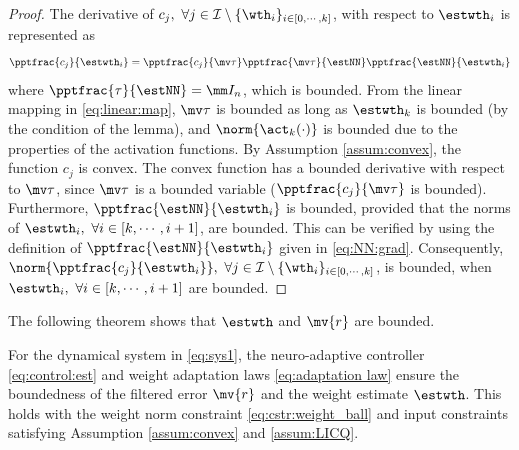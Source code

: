 \documentclass[lettersize,journal]{IEEEtran}
\newcommand*{\fe}{\mv{r}}
\begin{document}
\begin{proof}

The derivative of $c_j,\ \forall j\in\mathcal I \setminus \{\wth_i\}_{i\in[0,\cdots,k]}$, with respect to $\estwth_i$ is represented as
\begin{equation}
    \pptfrac{c_j}{\estwth_i} 
    = 
    \pptfrac{c_j}{\mv\tau} 
    \pptfrac{\mv\tau}{\estNN} 
    \pptfrac{\estNN}{\estwth_i}
\end{equation}
where $\pptfrac{\tau}{\estNN}=\mm I_n$, which is bounded. 
From the linear mapping in \eqref{eq:linear:map}, $\mv\tau$ is bounded as long as $\estwth_k$ is bounded (by the condition of the lemma), and $\norm{\act_k(\cdot)}$ is bounded due to the properties of the activation functions. 
By Assumption \ref{assum:convex}, the function $c_j$ is convex. 
The convex function has a bounded derivative with respect to $\mv\tau$, since $\mv\tau$ is a bounded variable (\ie $\pptfrac{c_j}{\mv\tau}$ is bounded). 
Furthermore, $\pptfrac{\estNN}{\estwth_i}$ is bounded, provided that the norms of $\estwth_i,\ \forall i \in[k,\cdots,i+1]$, are bounded. 
This can be verified by using the definition of $\pptfrac{\estNN}{\estwth_i}$ given in \eqref{eq:NN:grad}.
Consequently, $\norm{\pptfrac{c_j}{\estwth_i}},\ \forall j\in\mathcal I \setminus \{\wth_i\}_{i\in[0,\cdots,k]}$, is bounded, when $\estwth_i,\ \forall i\in [k,\cdots,i+1]$ are bounded.

\end{proof}

The following theorem shows that $\estwth$ and $\fe$ are bounded.

\begin{theorem}
    For the dynamical system in \eqref{eq:sys1}, the neuro-adaptive controller \eqref{eq:control:est} and weight adaptation laws \eqref{eq:adaptation law} ensure the boundedness of the filtered error $\fe$ and the weight estimate $\estwth$. 
    This holds with the weight norm constraint \eqref{eq:cstr:weight_ball} and input constraints satisfying Assumption \ref{assum:convex} and \ref{assum:LICQ}.
\end{theorem}
\end{document}
